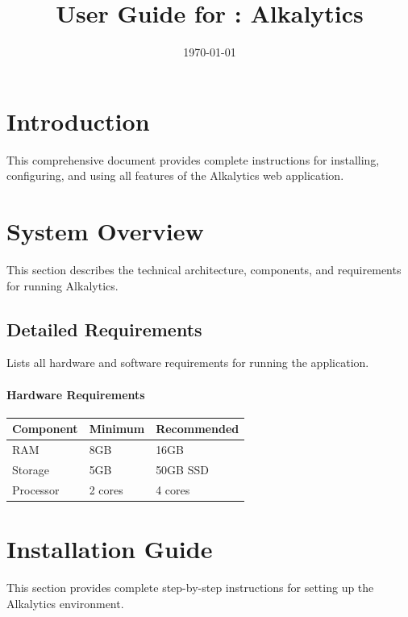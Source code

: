 \documentclass[12pt]{article}
\title{User Guide for \progname: Alkalytics}
\author{\authname}
\date{\today}
\begin{document}
\maketitle
\newpage
\tableofcontents
\newpage

\section{Introduction}

This comprehensive document provides complete instructions for installing,
configuring, and using all features of the Alkalytics web application.

\section{System Overview}

This section describes the technical architecture, components, and requirements
for running Alkalytics.

\subsection{Detailed Requirements}

Lists all hardware and software requirements for running the application.

\paragraph{Hardware Requirements}
\begin{table}[H]
    \centering
    \begin{tabularx}{\textwidth}{llX}
        \toprule
        \textbf{Component} & \textbf{Minimum} & \textbf{Recommended} \\
        \midrule
        RAM & 8GB & 16GB \\
        Storage & 5GB & 50GB SSD \\
        Processor & 2 cores & 4 cores \\
        \bottomrule
    \end{tabularx}
\end{table}

\section{Installation Guide}

This section provides complete step-by-step instructions for setting up the
Alkalytics environment.
\end{document}
